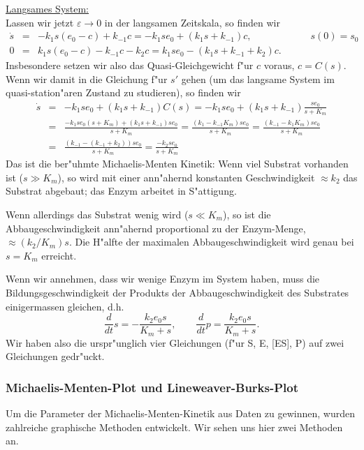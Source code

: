 \underline{Langsames System:} \\
Lassen wir jetzt $\varepsilon\rightarrow 0$ in der langsamen Zeitskala, 
so finden wir 
\begin{eqnarray*}
\dot s & = & -k_1 s (e_0-c) + k_{-1} c
        =  -k_1 s e_0 + (k_1 s + k_{-1}) c,\qquad\qquad\qquad s(0) = s_0\\
0 & = & k_1 s (e_0-c) - k_{-1} c - k_2 c
        =  k_1 s e_0 - (k_1 s + k_{-1} + k_2) c.
\end{eqnarray*}
Insbesondere setzen wir also das Quasi-Gleichgewicht 
f"ur $c$ voraus, $c=C(s)$.
Wenn wir damit in die Gleichung f"ur $s'$ gehen (um das langsame System im 
quasi-station"aren Zustand zu studieren), so finden wir
\begin{eqnarray*} \dot s 
&= &
  -k_1 s e_0 + (k_1 s + k_{-1}) C(s)
 =          -k_1 s e_0 + (k_1 s + k_{-1}) \frac{s e_0}{ s + K_m}\\
&= &\frac{-k_1 s e_0(s + K_m)+ (k_1 s + k_{-1})s e_0}{s + K_m}
= \frac{(k_1-k_{-1}K_m)s e_0}{s + K_m}
= \frac{(k_{-1}-k_{1}K_m)s e_0}{s + K_m}\\
&=& \frac{(k_{-1}-(k_{-1} + k_2))s e_0}{s + K_m}
= \frac{- k_2 s e_0}{s + K_m}
\end{eqnarray*}
Das ist die ber"uhmte Michaelis-Menten Kinetik: Wenn viel Substrat vorhanden ist 
($s\gg K_m$), so wird mit einer ann"ahernd konstanten Geschwindigkeit $\approx k_2$ 
das Substrat abgebaut; das Enzym arbeitet in S"attigung. 

Wenn allerdings das Substrat wenig wird ($s\ll K_m$), so ist die Abbaugeschwindigkeit 
ann"ahernd proportional zu der Enzym-Menge, $\approx (k_2/K_m) s$. Die H"alfte
der maximalen Abbaugeschwindigkeit wird genau bei $s=K_m$ erreicht.

Wenn wir annehmen, dass wir wenige Enzym im System haben, muss die Bildungsgeschwindigkeit der Produkts
der Abbaugeschwindigkeit des Substrates einigermassen gleichen, d.h.
$$ \frac d {dt} s = -\frac{k_2 e_0 s}{K_m+s},\qquad \frac d {dt} p = \frac{k_2 e_0 s}{K_m+s}.$$
Wir haben also die urspr"unglich vier Gleichungen (f"ur S, E, [ES], P) auf zwei Gleichungen gedr"uckt.

 \subsubsection{Michaelis-Menten-Plot und Lineweaver-Burks-Plot}

Um die Parameter der Michaelis-Menten-Kinetik aus Daten zu 
gewinnen, wurden zahlreiche graphische Methoden entwickelt. Wir sehen uns hier zwei 
Methoden an.

